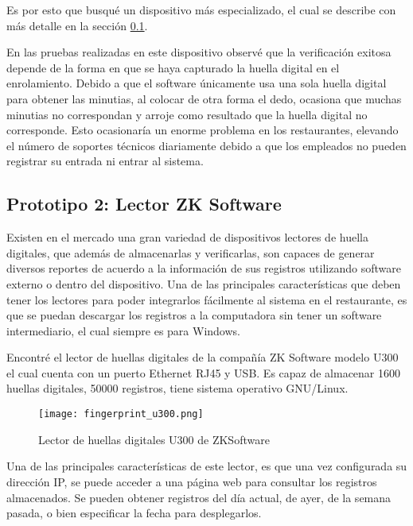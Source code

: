 Es por esto que busqué un dispositivo más especializado, el cual se describe con más detalle en la sección \ref{sec:lector_zksoftware}.

En las pruebas realizadas en este dispositivo observé que la verificación exitosa depende de la forma en que se haya capturado la huella digital en el enrolamiento. Debido a que el software únicamente usa una sola huella digital para obtener las minutias, al colocar de otra forma el dedo, ocasiona que muchas minutias no correspondan y arroje como resultado que la huella digital no corresponde. Esto ocasionaría un enorme problema en los restaurantes, elevando el número de soportes técnicos diariamente debido a que los empleados no pueden registrar su entrada ni entrar al sistema.

\subsection{Prototipo 2: Lector ZK Software}
\label{sec:lector_zksoftware}

Existen en el mercado una gran variedad de dispositivos lectores de huella digitales, que además de almacenarlas y verificarlas, son capaces de generar diversos reportes de acuerdo a la información de sus registros utilizando software externo o dentro del dispositivo. Una de las principales características que deben tener los lectores para poder integrarlos fácilmente al sistema en el restaurante, es que se puedan descargar los registros a la computadora sin tener un software intermediario, el cual siempre es para Windows. 

Encontré el lector de huellas digitales de la compañía ZK Software modelo U300 el cual cuenta con un puerto Ethernet RJ45 y USB. Es capaz de almacenar 1600 huellas digitales, 50000 registros, tiene sistema operativo GNU/Linux.

\begin{figure}[htb]
 \begin{center}
  \texttt{[image: fingerprint\_u300.png]}
 \end{center}
 \caption{Lector de huellas digitales U300 de ZKSoftware}
 \label{fig:finger_print_7}
\end{figure}

Una de las principales características de este lector, es que una vez configurada su dirección IP, se puede acceder a una página web para consultar los registros almacenados. Se pueden obtener registros del día actual, de ayer, de la semana pasada, o bien especificar la fecha para desplegarlos. 

